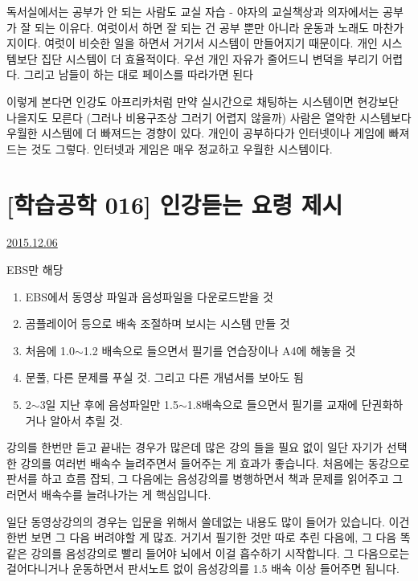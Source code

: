 독서실에서는 공부가 안 되는 사람도 교실 자습 - 야자의 교실책상과 의자에서는 공부가 잘 되는 이유다.
여럿이서 하면 잘 되는 건 공부 뿐만 아니라 운동과 노래도 마찬가지이다.
여럿이 비슷한 일을 하면서 거기서 시스템이 만들어지기 때문이다.
개인 시스템보단 집단 시스템이 더 효율적이다. 우선 개인 자유가 줄어드니 변덕을 부리기 어렵다.
그리고 남들이 하는 대로 페이스를 따라가면 된다
\vspace{5mm}

이렇게 본다면 인강도 아프리카처럼 만약 실시간으로 채팅하는 시스템이면 현강보단 나을지도 모른다
(그러나 비용구조상 그러기 어렵지 않을까)
사람은 열악한 시스템보다 우월한 시스템에 더 빠져드는 경향이 있다.
개인이 공부하다가 인터넷이나 게임에 빠져드는 것도 그렇다. 인터넷과 게임은 매우 정교하고 우월한 시스템이다.
\vspace{5mm}





\section{[학습공학 016] 인강듣는 요령 제시}
\href{https://www.kockoc.com/Apoc/529777}{2015.12.06}

\vspace{5mm}

EBS만 해당
\vspace{5mm}
\begin{enumerate}
    \item EBS에서 동영상 파일과 음성파일을 다운로드받을 것
    \item 곰플레이어 등으로 배속 조절하며 보시는 시스템 만들 것
    \item 처음에 1.0$\sim$1.2 배속으로 들으면서 필기를 연습장이나 A4에 해놓을 것
    \item 문풀, 다른 문제를 푸실 것. 그리고 다른 개념서를 보아도 됨
    \item 2$\sim$3일 지난 후에 음성파일만 1.5$\sim$1.8배속으로 들으면서 필기를 교재에 단권화하거나 알아서 추릴 것.
\end{enumerate}
\vspace{5mm}

강의를 한번만 듣고 끝내는 경우가 많은데
많은 강의 들을 필요 없이 일단 자기가 선택한 강의를 여러번 배속수 늘려주면서 들어주는 게 효과가 좋습니다.
처음에는 동강으로 판서를 하고 흐름 잡되, 그 다음에는 음성강의를 병행하면서 책과 문제를 읽어주고
그러면서 배속수를 늘려나가는 게 핵심입니다.
\vspace{5mm}

일단 동영상강의의 경우는 입문을 위해서 쓸데없는 내용도 많이 들어가 있습니다. 이건 한번 보면 그 다음 버려야할 게 많죠.
거기서 필기한 것만 따로 추린 다음에, 그 다음 똑같은 강의를 음성강의로 빨리 들어야 뇌에서 이걸 흡수하기 시작합니다.
그 다음으로는 걸어다니거나 운동하면서 판서노트 없이 음성강의를 1.5 배속 이상 들어주면 됩니다.
\vspace{5mm}

